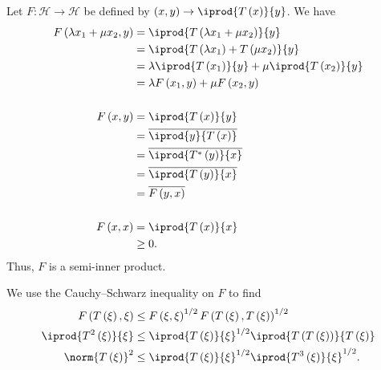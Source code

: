 \documentclass[10pt]{mypackage}
\begin{document}
\begin{solution}
  Let $F: \mathcal{H}\rightarrow \mathcal{H}$ be defined by $\left(x,y\right) \rightarrow \iprod{T\left(x\right)}{y}$. We have
  \begin{align*}
    F\left(\lambda x_1 + \mu x_2,y\right) &= \iprod{T\left(\lambda x_1 + \mu x_2\right)}{y}\\
                                          &= \iprod{T\left(\lambda x_1\right) + T\left(\mu x_2\right)}{y}\\
                                          &= \lambda \iprod{T\left(x_1\right)}{y} + \mu \iprod{T\left(x_2\right)}{y}\\
                                          &= \lambda F\left(x_1,y\right) + \mu F\left(x_2,y\right)\\
                                          \\
    F\left(x,y\right) &= \iprod{T\left(x\right)}{y}\\
                      &= \overline{ \iprod{y}{T\left(x\right)} }\\
                      &= \overline{ \iprod{T^{\ast}\left(y\right)}{x} }\\
                      &= \overline{ \iprod{T\left(y\right)}{x} }\\
                      &= \overline{F\left(y,x\right)}\\
                      \\
    F\left(x,x\right) &= \iprod{T\left(x\right)}{x}\\
                      &\geq 0.
  \end{align*}
  Thus, $F$ is a semi-inner product.\newline

  We use the Cauchy--Schwarz inequality on $F$ to find
  \begin{align*}
    F\left(T\left(\xi\right),\xi\right) &\leq F\left(\xi,\xi\right)^{1/2}F\left(T\left(\xi\right),T\left(\xi\right)\right)^{1/2}\\
    \iprod{T^2\left(\xi\right)}{\xi} &\leq \iprod{T\left(\xi\right)}{\xi}^{1/2} \iprod{T\left(T\left(\xi\right)\right)}{T\left(\xi\right)}\\
    \norm{T\left(\xi\right)}^2 &\leq \iprod{T\left(\xi\right)}{\xi}^{1/2} \iprod{T^3\left(\xi\right)}{\xi}^{1/2}.
  \end{align*}
  
\end{solution}
\end{document}
